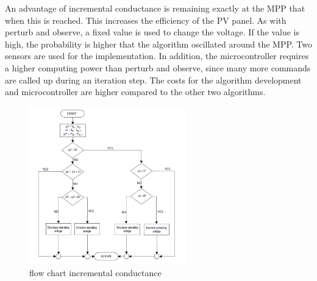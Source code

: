 An advantage of incremental conductance is remaining exactly at the MPP that when this is reached. This increases the efficiency of the PV panel. As with perturb and observe, a fixed value is used to change the voltage. If the value is high, the probability is higher that the algorithm oscillated around the MPP. 
Two sensors are used for the implementation. In addition, the microcontroller requires a higher computing power than perturb and observe, since many more commands are called up during an iteration step. The costs for the algorithm development and microcontroller are higher compared to the other two algorithms\cite{AN1521_MC}.
\begin{figure}[H]
	\begin{center}
		\includegraphics[width=0.605\textwidth]{../Pictures/P1/Flow_chart/flow_chart_incremental_conductance}
		\caption{flow chart incremental conductance \cite{AN1521_MC} }
		\label{fcinccon}
	\end{center}	
\end{figure}

%



